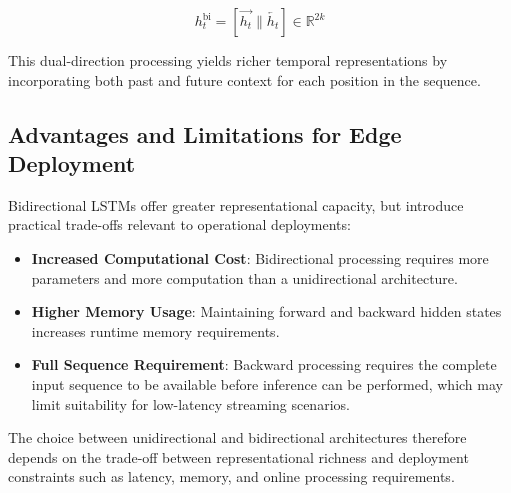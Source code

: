 \begin{equation}
    h_t^{\text{bi}} = [\overrightarrow{h_t} \| \overleftarrow{h_t}]
    \in \mathbb{R}^{2k}
    \label{eq:bilstm}
\end{equation}

This dual-direction processing yields richer temporal representations by incorporating
both past and future context for each position in the sequence.

\subsection{Advantages and Limitations for Edge Deployment}
\label{subsec:bilstm_tradeoffs}

Bidirectional LSTMs offer greater representational capacity, but introduce practical
trade-offs relevant to operational deployments:

\begin{itemize}
    \item \textbf{Increased Computational Cost}: Bidirectional processing requires more
    parameters and more computation than a unidirectional architecture.

    \item \textbf{Higher Memory Usage}: Maintaining forward and backward hidden states
    increases runtime memory requirements.

    \item \textbf{Full Sequence Requirement}: Backward processing requires the complete
    input sequence to be available before inference can be performed, which may limit
    suitability for low-latency streaming scenarios.
\end{itemize}

The choice between unidirectional and bidirectional architectures therefore depends on
the trade-off between representational richness and deployment constraints such as
latency, memory, and online processing requirements.
